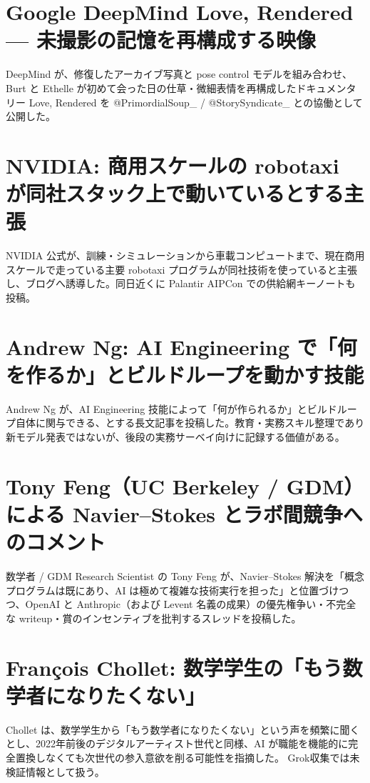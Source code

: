 \section{Google DeepMind Love, Rendered --- 未撮影の記憶を再構成する映像}
DeepMind が、修復したアーカイブ写真と pose control モデルを組み合わせ、Burt と Ethelle が初めて会った日の仕草・微細表情を再構成したドキュメンタリー Love, Rendered を @PrimordialSoup\_ / @StorySyndicate\_ との協働として公開した。

\section{NVIDIA: 商用スケールの robotaxi が同社スタック上で動いているとする主張}
NVIDIA 公式が、訓練・シミュレーションから車載コンピュートまで、現在商用スケールで走っている主要 robotaxi プログラムが同社技術を使っていると主張し、ブログへ誘導した。同日近くに Palantir AIPCon での供給網キーノートも投稿。

\section{Andrew Ng: AI Engineering で「何を作るか」とビルドループを動かす技能}
Andrew Ng が、AI Engineering 技能によって「何が作られるか」とビルドループ自体に関与できる、とする長文記事を投稿した。教育・実務スキル整理であり新モデル発表ではないが、後段の実務サーベイ向けに記録する価値がある。

\section{Tony Feng（UC Berkeley / GDM）による Navier--Stokes とラボ間競争へのコメント}
数学者 / GDM Research Scientist の Tony Feng が、Navier--Stokes 解決を「概念プログラムは既にあり、AI は極めて複雑な技術実行を担った」と位置づけつつ、OpenAI と Anthropic（および Levent 名義の成果）の優先権争い・不完全な writeup・賞のインセンティブを批判するスレッドを投稿した。

\section{François Chollet: 数学学生の「もう数学者になりたくない」}
Chollet は、数学学生から「もう数学者になりたくない」という声を頻繁に聞くとし、2022年前後のデジタルアーティスト世代と同様、AI が職能を機能的に完全置換しなくても次世代の参入意欲を削る可能性を指摘した。 Grok収集では未検証情報として扱う。

